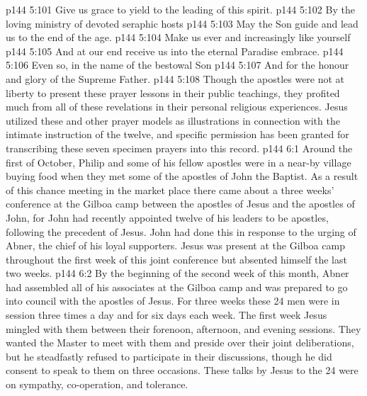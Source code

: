 \vs p144 5:101 \hsetoff Give us grace to yield to the leading of this spirit.
\vs p144 5:102 By the loving ministry of devoted seraphic hosts
\vs p144 5:103 \hsetoff May the Son guide and lead us to the end of the age.
\vs p144 5:104 Make us ever and increasingly like yourself
\vs p144 5:105 \hsetoff And at our end receive us into the eternal Paradise embrace.
\vs p144 5:106 Even so, in the name of the bestowal Son
\vs p144 5:107 \hsetoff And for the honour and glory of the Supreme Father.
\vspace*{1ex}
\vs p144 5:108 Though the apostles were not at liberty to present these prayer lessons in their public teachings, they profited much from all of these revelations in their personal religious experiences. Jesus utilized these and other prayer models as illustrations in connection with the intimate instruction of the twelve, and specific permission has been granted for transcribing these seven specimen prayers into this record.
\vs p144 6:1 Around the first of October, Philip and some of his fellow apostles were in a near\hyp{}by village buying food when they met some of the apostles of John the Baptist. As a result of this chance meeting in the market place there came about a three weeks’ conference at the Gilboa camp between the apostles of Jesus and the apostles of John, for John had recently appointed twelve of his leaders to be apostles, following the precedent of Jesus. John had done this in response to the urging of Abner, the chief of his loyal supporters. Jesus was present at the Gilboa camp throughout the first week of this joint conference but absented himself the last two weeks.
\vs p144 6:2 By the beginning of the second week of this month, Abner had assembled all of his associates at the Gilboa camp and was prepared to go into council with the apostles of Jesus. For three weeks these 24 men were in session three times a day and for six days each week. The first week Jesus mingled with them between their forenoon, afternoon, and evening sessions. They wanted the Master to meet with them and preside over their joint deliberations, but he steadfastly refused to participate in their discussions, though he did consent to speak to them on three occasions. These talks by Jesus to the 24 were on sympathy, co\hyp{}operation, and tolerance.
